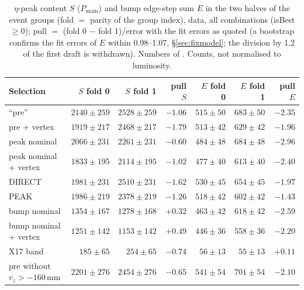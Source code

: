\documentclass[11pt,a4paper]{article}
\newcommand{\code}[1]{\texttt{\detokenize{#1}}}
\newcommand{\Pmain}{\ensuremath{P_{\mathrm{main}}}\xspace}
\newcommand{\vz}{\ensuremath{v_z}\xspace}
\begin{document}
\begin{table}[H]
\centering
\caption{$\eta$-peak content $S$ (\Pmain) and bump edge-step sum $E$ in the two halves of the event groups (fold $=$ parity of the group
index), data, all combinations (isBest $\ge0$); pull $=$ (fold 0 $-$ fold 1)/error with the fit errors as quoted (a bootstrap confirms the
fit errors of $E$ within 0.98--1.07, \S\ref{sec:fixmodel}; the division by 1.2 of the first draft is withdrawn). Numbers of
\code{tables_exp/opt_named.txt}. Counts, not normalised to luminosity.}
\label{tab:folds}
\small
\begin{tabular}{@{}l r r r r r r@{}}
\toprule
Selection & $S$ fold 0 & $S$ fold 1 & pull $S$ & $E$ fold 0 & $E$ fold 1 & pull $E$ \\
\midrule
``pre'' & $2140\pm259$ & $2528\pm259$ & $-1.06$ & $515\pm50$ & $683\pm50$ & $-2.35$ \\
pre + vertex & $1919\pm217$ & $2468\pm217$ & $-1.79$ & $513\pm42$ & $629\pm42$ & $-1.96$ \\
peak nominal & $2066\pm231$ & $2261\pm231$ & $-0.60$ & $484\pm48$ & $684\pm48$ & $-2.96$ \\
peak nominal + vertex & $1833\pm195$ & $2114\pm195$ & $-1.02$ & $477\pm40$ & $613\pm40$ & $-2.40$ \\
DIRECT & $1981\pm231$ & $2510\pm231$ & $-1.62$ & $530\pm45$ & $654\pm45$ & $-1.97$ \\
PEAK & $1986\pm219$ & $2378\pm219$ & $-1.26$ & $518\pm42$ & $602\pm42$ & $-1.43$ \\
bump nominal & $1354\pm167$ & $1278\pm168$ & $+0.32$ & $463\pm42$ & $618\pm42$ & $-2.59$ \\
bump nominal + vertex & $1251\pm142$ & $1153\pm142$ & $+0.49$ & $446\pm36$ & $558\pm36$ & $-2.20$ \\
X17 band & $185\pm65$ & $254\pm65$ & $-0.74$ & $56\pm13$ & $55\pm13$ & $+0.11$ \\
pre without $\vz>-160$\,mm & $2201\pm276$ & $2454\pm276$ & $-0.65$ & $541\pm54$ & $701\pm54$ & $-2.10$ \\
\bottomrule
\end{tabular}
\end{table}


\end{document}
